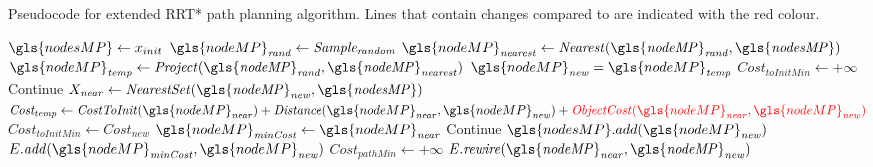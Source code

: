 \newpage
\begin{algorithm}[H]
  \caption{Pseudocode for extended \ac{RRT*} path planning algorithm. Lines that contain changes compared to  are indicated with the red colour.}%
  \label{pseudocode:modified_proposed_rrt_star}
  \begin{algorithmic}[1]
    \State $\gls{nodesMP} \leftarrow x_{init}$
        \State $\gls{nodeMP}_\mathit{rand} \leftarrow \mathit{Sample_{random}}$ 
      \State $\gls{nodeMP}_\mathit{nearest} \leftarrow \mathit{Nearest(\gls{nodeMP}_{rand}, \gls{nodesMP})}$
      \State $\gls{nodeMP}_\mathit{temp} \leftarrow \mathit{Project(\gls{nodeMP}_{rand}, \gls{nodeMP}_{nearest})}$
      \State $\gls{nodeMP}_\mathit{new} = \gls{nodeMP}_\mathit{temp}$
      \State $\mathit{Cost_{toInitMin}} \leftarrow +\infty$ 
      \Else
      \State Continue
      \EndIf
      \State $X_\mathit{near} \leftarrow \mathit{NearestSet(\gls{nodeMP}_{new}, \gls{nodesMP})}$ 
    \State $\mathit{Cost_{temp}} \leftarrow \mathit{CostToInit}(\gls{nodeMP}_\mathit{near}) + \mathit{Distance}(\gls{nodeMP}_\mathit{near}, \gls{nodeMP}_\mathit{new}) + \textcolor{red}{\mathit{ObjectCost}(\gls{nodeMP}_\mathit{near}, \gls{nodeMP}_\mathit{new})}$
      \State $\mathit{Cost_{toInitMin}} \leftarrow \mathit{Cost_{new}}$
      \State $\gls{nodeMP}_\mathit{minCost} \leftarrow \gls{nodeMP}_\mathit{near}$
      \EndIf
      \EndFor
          \State Continue
      \Else
      \State $\gls{nodesMP}.add(\gls{nodeMP}_\mathit{new})$
      \State $E.\mathit{add}(\gls{nodeMP}_\mathit{minCost}, \gls{nodeMP}_\mathit{new})$
      \EndIf
      \State $\mathit{Cost_{pathMin}} \leftarrow +\infty$ 
      \State $\mathit{E.rewire(\gls{nodeMP}_{near}, \gls{nodeMP}_{new})}$
      \EndIf
      \Else {}


\end{algorithmic}
\end{algorithm}
